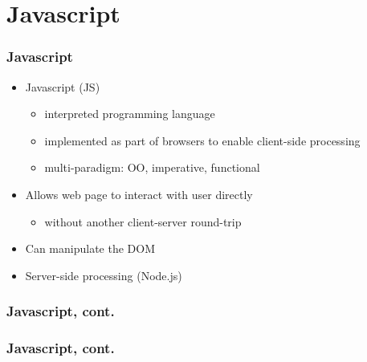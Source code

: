 \documentclass{beamer}
\begin{document}
\section{Javascript} 
\begin{frame}[fragile]\frametitle{Javascript} 

  \begin{itemize}
    \item Javascript (JS)
    \begin{itemize}
      \item interpreted programming language
      \item implemented as part of browsers to enable client-side processing
      \item multi-paradigm: OO, imperative, functional
    \end{itemize}
    \item Allows web page to interact with user directly
    \begin{itemize}
      \item without another client-server round-trip
    \end{itemize}
    \item Can manipulate the DOM
    \item Server-side processing (Node.js)
  \end{itemize}
  
\end{frame}



\begin{frame}[fragile]\frametitle{Javascript, cont.} 

  

\end{frame}



\begin{frame}[fragile]\frametitle{Javascript, cont.} 

  

  

\end{frame}
\end{document}
